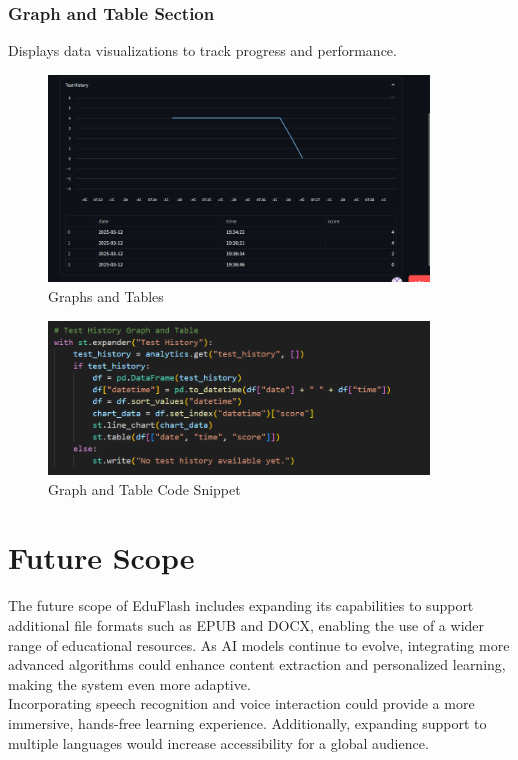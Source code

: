 \documentclass{report}
\begin{document}
\subsection{Graph and Table Section}
Displays data visualizations to track progress and performance.
\begin{figure}[H]
\centering
\includegraphics[width=0.9\textwidth]{graph-table.png}
\caption{Graphs and Tables}
\end{figure}
\begin{figure}[H]
\centering
\includegraphics[width=0.9\textwidth]{graph-table-code.png}
\caption{Graph and Table Code Snippet}
\end{figure}

\chapter{Future Scope}

The future scope of EduFlash includes expanding its capabilities to support additional file formats such as EPUB and DOCX, enabling the use of a wider range of educational resources. As AI models continue to evolve, integrating more advanced algorithms could enhance content extraction and personalized learning, making the system even more adaptive.\\

Incorporating speech recognition and voice interaction could provide a more immersive, hands-free learning experience. Additionally, expanding support to multiple languages would increase accessibility for a global audience.\\
\end{document}
